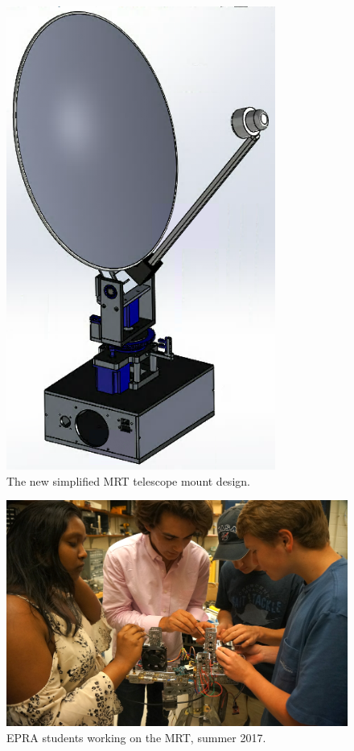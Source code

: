 \documentclass[11pt,letterpaper]{spie}
\begin{document}
\begin{figure}[h]
\centering
\includegraphics[height=6in]{NewMRT/threequarter.png}
\vspace{5pt}
\caption{The new simplified MRT telescope mount design.}
\label{fig:NewMRTthreequarter}
\end{figure}

\begin{figure}[h]
\centering
\includegraphics[width=6.5in]{EPRA_working.jpg}
\vspace{5pt}
\caption{EPRA students working on the MRT, summer 2017.}
\label{fig:Devices}
\end{figure}
\end{document}
